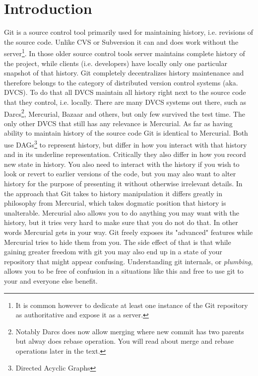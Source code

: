 \documentclass{article}
\theoremstyle{definition}
\begin{document}
       \section{Introduction}
        Git is a source control tool primarily used for maintaining history, i.e. revisions of the source code. Unlike CVS or
        Subversion it can and does work without the server\footnote{It is common however to dedicate at least one instance
        of the Git repository as authoritative and expose it as a server.}. In those older source control tools server
        maintains complete history of the project, while clients (i.e. developers) have locally only one particular snapshot
        of that history. Git completely decentralizes history maintenance and therefore belongs to the category of
        distributed version control systems (aka. DVCS). To do that all DVCS maintain all history right next to the source
        code that they control, i.e. locally. There are many DVCS systems out there, such as Darcs\footnote{Notably Darcs
        does now allow merging where new commit has two parents but alway does rebase operation. You will read about merge
        and rebase operations later in the text.}, Mercurial, Bazaar and others, but only few survived the test time. The
        only other DVCS that still has any relevance is Mercurial. As far as having ability to maintain history of the
        source code Git is identical to Mercurial. Both use DAGs\footnote{Directed Acyclic Graphs} to represent history, but
        differ in how you interact with that history and in its underline representation. Critically they also differ in how
        you record new state in history. You also need to interact with the history if you wish to look or revert to earlier
        versions of the code, but you may also want to alter history for the purpose of presenting it without otherwise
        irrelevant details. In the approach that Git takes to history manipulation it differs greatly in philosophy from
        Mercurial, which takes dogmatic position that history is unalterable. Mercurial also allows you to do anything you
        may want with the history, but it tries very hard to make sure that you do not do that. In other words Mercurial gets
        in your way. Git freely exposes its "advanced" features while Mercurial tries to hide them from you. The side effect
        of that is that while gaining greater freedom with git you may also end up in a state of your repository that might
        appear confusing. Understanding git internals, or {\em plumbing}, allows you to be free of confusion in a situations
        like this and free to use git to your and everyone else benefit.
\end{document}

